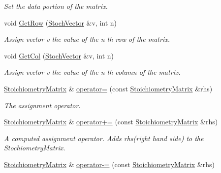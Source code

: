 \begin{CompactItemize}
\begin{CompactList}\small\item\em Set the data portion of the matrix. \item\end{CompactList}\item 
void \hyperlink{class_stoichiometry_matrix_8bffb2859030b110bafb924557ef611b}{GetRow} (\hyperlink{class_stoch_vector}{StochVector} \&v, int n)
\begin{CompactList}\small\item\em Assign vector v the value of the n th row of the matrix. \item\end{CompactList}\item 
void \hyperlink{class_stoichiometry_matrix_47b1e50dfcd12d5aa211d98fe288018a}{GetCol} (\hyperlink{class_stoch_vector}{StochVector} \&v, int n)
\begin{CompactList}\small\item\em Assign vector v the value of the n th column of the matrix. \item\end{CompactList}\item 
\hypertarget{class_stoichiometry_matrix_f84acc2dfc616180c1653dc5c88806d9}{
\hyperlink{class_stoichiometry_matrix}{StoichiometryMatrix} \& \hyperlink{class_stoichiometry_matrix_f84acc2dfc616180c1653dc5c88806d9}{operator=} (const \hyperlink{class_stoichiometry_matrix}{StoichiometryMatrix} \&rhs)}
\label{class_stoichiometry_matrix_f84acc2dfc616180c1653dc5c88806d9}

\begin{CompactList}\small\item\em The assignment operator. \item\end{CompactList}\item 
\hypertarget{class_stoichiometry_matrix_fc1d361f657b497ed2835e4c8793be47}{
\hyperlink{class_stoichiometry_matrix}{StoichiometryMatrix} \& \hyperlink{class_stoichiometry_matrix_fc1d361f657b497ed2835e4c8793be47}{operator+=} (const \hyperlink{class_stoichiometry_matrix}{StoichiometryMatrix} \&rhs)}
\label{class_stoichiometry_matrix_fc1d361f657b497ed2835e4c8793be47}

\begin{CompactList}\small\item\em A computed assignment operator. Adds rhs(right hand side) to the StochiometryMatrix. \item\end{CompactList}\item 
\hypertarget{class_stoichiometry_matrix_affb22aa95cb75c432d5c2228074d682}{
\hyperlink{class_stoichiometry_matrix}{StoichiometryMatrix} \& \hyperlink{class_stoichiometry_matrix_affb22aa95cb75c432d5c2228074d682}{operator-=} (const \hyperlink{class_stoichiometry_matrix}{StoichiometryMatrix} \&rhs)}
\label{class_stoichiometry_matrix_affb22aa95cb75c432d5c2228074d682}


\end{CompactItemize}
